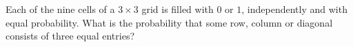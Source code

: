 Each of the nine cells of a $3\times3$ grid is filled with $0$ or $1$, independently and with equal probability. What is the probability that some row, column or diagonal consists of three equal entries?
